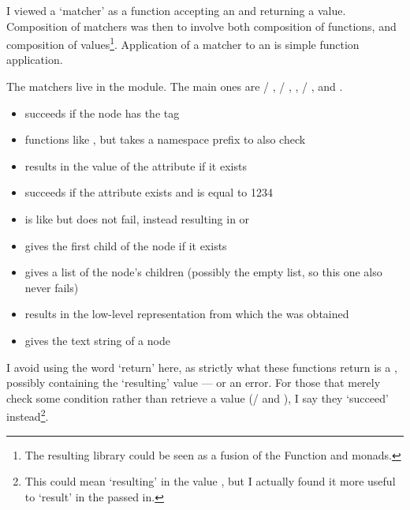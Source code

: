 \documentclass[12pt,a4paper,twoside,openright]{report}
\begin{document}
{I viewed a `matcher' as a function accepting an  and returning a  value. Composition of matchers was then to involve both composition of functions, and composition of  values\footnote{The resulting library could be seen as a fusion of the Function and  monads.}. Application of a matcher to an  is simple function application.

The matchers live in the  module. The main ones are  / ,  / , ,  / ,  and .

\begin{itemize}
  \item {} succeeds if the node has the  tag

  \item {} functions like , but takes a namespace prefix to also check

  \item {} results in the value of the  attribute if it exists

  \item {} succeeds if the  attribute exists and is equal to 1234

  \item {} is like  but does not fail, instead resulting in  or 

  \item {} gives the first child of the node if it exists

  \item {} gives a list of the node's children (possibly the empty list, so this one also never fails)

  \item {} results in the low-level  representation from which the  was obtained

  \item {} gives the text string of a  node
\end{itemize}

I avoid using the word `return' here, as strictly what these functions return is a , possibly containing the `resulting' value --- or an error. For those that merely check some condition rather than retrieve a value (/ and ), I say they `succeed' instead\footnote{This could mean `resulting' in the value \code{()}, but I actually found it more useful to `result' in the  passed in.}.

}
\end{document}
